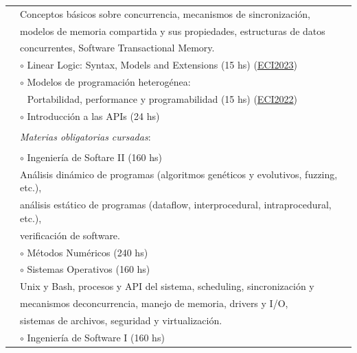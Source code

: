 \documentclass{article}
\newcommand{\shade}[1]{\textcolor{myGray}{#1}}
\begin{document}
\begin{longtable}{l l}
                    & \indent \shade{Conceptos básicos sobre concurrencia, mecanismos de sincronización,} \\
                    & \indent \shade{modelos de memoria  compartida y sus propiedades, estructuras de datos } \\
                    & \indent \shade{concurrentes, Software Transactional Memory.} \\
                    & $\circ$ Linear Logic: Syntax, Models and Extensions \shade{(15 hs)} \hfill \shade{(\href{https://eci.dc.uba.ar/ecis-anteriores/eci2023/}{ECI2023})} \\
                    & $\circ$ Modelos de programación heterogénea: \\
                    & $~~$ Portabilidad, performance y programabilidad \shade{(15 hs)} \hfill \shade{(\href{https://eci.dc.uba.ar/ecis-anteriores/eci2022/}{ECI2022})} \\
                    & $\circ$ Introducción a las APIs \shade{(24 hs)} \\
                    \\
                    & \textit{Materias obligatorias cursadas\footnotemark[1]}: \\
                    \\
                    & $\circ$ Ingeniería de Softare II \shade{(160 hs)} \\
                    & \indent \shade{Análisis dinámico de programas (algoritmos genéticos y evolutivos, fuzzing, etc.),} \\
                    & \indent \shade{análisis estático de programas (dataflow, interprocedural, intraprocedural, etc.),} \\
                    & \indent \shade{verificación de software.} \\
                    & $\circ$ Métodos Numéricos \shade{(240 hs)} \\
                    & $\circ$ Sistemas Operativos \shade{(160 hs)} \\
                    & \indent \shade{Unix y Bash, procesos y API del sistema, scheduling, sincronización y} \\
                    & \indent \shade{mecanismos deconcurrencia, manejo de memoria, drivers y I/O,} \\
                    & \indent \shade{sistemas de archivos, seguridad y virtualización.} \\
                    & $\circ$ Ingeniería de Software I \shade{(160 hs)} \\

\end{longtable}
\end{document}
